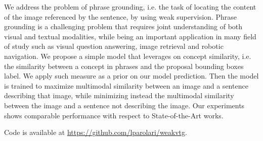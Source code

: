 
We address the problem of phrase grounding, i.e. the task of locating
the content of the image referenced by the sentence, by using weak
supervision. Phrase grounding is a challenging problem that requires
joint understanding of both visual and textual modalities, while being
an important application in many field of study such as visual
question answering, image retrieval and robotic navigation. We propose
a simple model that leverages on concept similarity, i.e. the
similarity between a concept in phrases and the proposal bounding
boxes label. We apply such measure as a prior on our model prediction.
Then the model is trained to maximize multimodal similarity between an
image and a sentence describing that image, while minimizing instead
the multimodal similarity between the image and a sentence not
describing the image. Our experiments shows comparable performance
with respect to State-of-the-Art works.

Code is available at
\href{https://github.com/lparolari/weakvtg}{https://github.com/lparolari/weakvtg}.